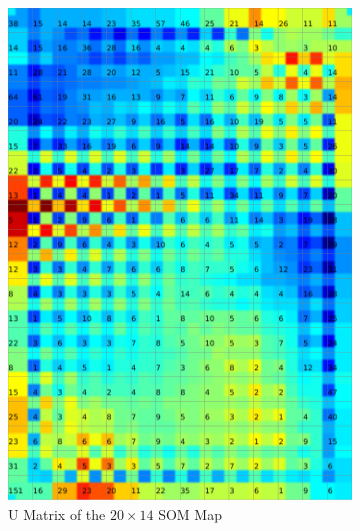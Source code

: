 \documentclass{acm_proc_article-sp}
\begin{document}
\begin{figure}
\centering
    \centering
    \begin{subfigure}[b]{0.45\linewidth}
        \includegraphics[width=\linewidth]{img/wine-weird-u-matrix}
        \caption{U Matrix of the $20\times14$ SOM Map}
        \label{fig:wine-weird-u-matrix}
    \end{subfigure}
    \begin{subfigure}[b]{0.45\linewidth}

\end{subfigure}
\end{figure}
\end{document}
